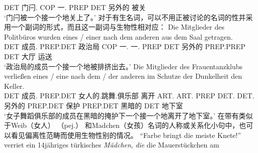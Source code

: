 	 DET 门闩.\mas{} COP 一.\mas{} PREP DET 另外的 被关\\
\glt `门闩被一个接一个地关上了。'
\zl
对于有生名词，可以不用正被讨论的名词的性并采用一个副词的形式，而且这一副词与生物性相对应：
\eal
\ex 
\gll Die Mitglieder des Politbüros wurden eines / einer nach dem anderen aus dem Saal getragen.\\
	 DET 成员.\neu{} PREP.DET 政治局 COP 一.\neu{} {} 一.\mas{} PREP DET 另外的 PREP.PREP DET 大厅 运送\\
\glt `政治局的成员一个接一个地被排挤出去。'
\ex 
\gll Die Mitglieder des Frauentanzklubs verließen eines / eine nach dem / der anderen im Schutze der Dunkelheit den
Keller.\\
DET 成员.\neu{} PREP.DET 女人的.跳舞.俱乐部 离开 ART.\neu{} {} ART.\fem{} PREP DET.\neu{} {} DET.\fem{} 另外的 PREP.DET 保护 PREP.DET 黑暗的 DET
地下室\\
\glt `女子舞蹈俱乐部的成员在黑暗的掩护下一个接一个地离开了地下室。'
\zl
在带有类似于Weib（女人） （pej.） 和Madchen（女孩）名词的人称或关系化小句中，也可以看见偏离性范畴而使用生物性别的情况。
\eal
\ex 
\gll "`Farbe bringt die meiste Knete!"' verriet ein 14jähriges türkisches {\em Mädchen\/}, {\em die\/} die Mauerstückchen am
